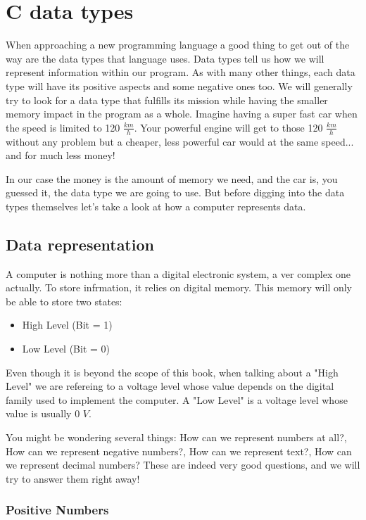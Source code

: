 \documentclass[12pt]{book}
\begin{document}
\chapter{C data types}

When approaching a new programming language a good thing to get out of the way are the data types that language uses. Data types tell us how we will represent information within our program. As with many other things, each data type will have its positive aspects and some negative ones too. We will generally try to look for a data type that fulfills its mission while having the smaller memory impact in the program as a whole. Imagine having a super fast car when the speed is limited to 120 $\frac{km}{h}$. Your powerful engine will get to those 120 $\frac{km}{h}$ without any problem but a cheaper, less powerful car would at the same speed... and for much less money!

In our case the money is the amount of memory we need, and the car is, you guessed it, the data type we are going to use. But before digging into the data types themselves let's take a look at how a computer represents data.

\section{Data representation}

A computer is nothing more than a digital electronic system, a ver complex one actually. To store infrmation, it relies on digital memory. This memory will only be able to store two states:
\begin{itemize}
  \item High Level (Bit = 1)
  \item Low Level  (Bit = 0)
\end{itemize}

Even though it is beyond the scope of this book, when talking about a "High Level" we are refereing to a voltage level whose value depends on the digital family used to implement the computer. A "Low Level" is a voltage level whose value is usually 0 $V$.

You might be wondering several things: How can we represent numbers at all?, How can we represent negative numbers?, How can we represent text?, How can we represent decimal numbers? These are indeed very good questions, and we will try to answer them right away!
\subsection{Positive Numbers}
\end{document}
